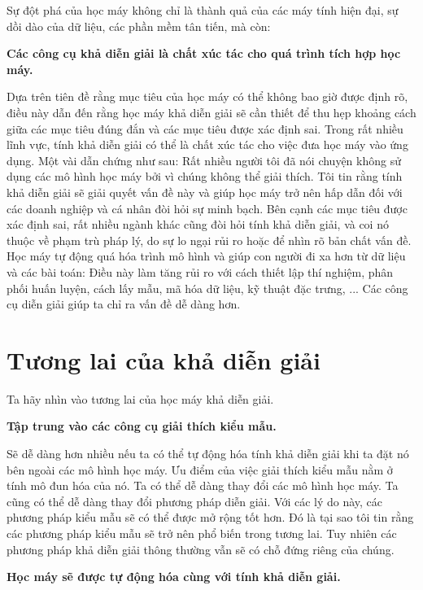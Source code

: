 Sự đột phá của học máy không chỉ là thành quả của các máy tính hiện đại, sự dồi dào của dữ liệu, các phần mềm tân tiến, mà còn:

\textbf{Các công cụ khả diễn giải là chất xúc tác cho quá trình tích hợp học máy.}

Dựa trên tiên đề rằng mục tiêu của học máy có thể không bao giờ được định rõ, điều này dẫn đến rằng học máy khả diễn giải sẽ cần thiết để thu hẹp khoảng cách giữa các mục tiêu đúng đắn và các mục tiêu được xác định sai. Trong rất nhiều lĩnh vực, tính khả diễn giải có thể là chất xúc tác cho việc đưa học máy vào ứng dụng. Một vài dẫn chứng như sau: Rất nhiều người tôi đã nói chuyện không sử dụng các mô hình học máy bởi vì chúng không thể giải thích. Tôi tin rằng tính khả diễn giải sẽ giải quyết vấn đề này và giúp học máy trở nên hấp dẫn đối với các doanh nghiệp và cá nhân đòi hỏi sự minh bạch. Bên cạnh các mục tiêu được xác định sai, rất nhiều ngành khác cũng đòi hỏi tính khả diễn giải, và coi nó thuộc về phạm trù pháp lý, do sự lo ngại rủi ro hoặc để nhìn rõ bản chất vấn đề. Học máy tự động quá hóa trình mô hình và giúp con người đi xa hơn từ dữ liệu và các bài toán: Điều này làm tăng rủi ro với cách thiết lập thí nghiệm, phân phối huấn luyện, cách lấy mẫu, mã hóa dữ liệu, kỹ thuật đặc trưng, ... Các công cụ diễn giải giúp ta chỉ ra vấn đề dễ dàng hơn.

\section{Tương lai của khả diễn giải}

Ta hãy nhìn vào tương lai của học máy khả diễn giải.

\textbf{Tập trung vào các công cụ giải thích kiểu mẫu.}

Sẽ dễ dàng hơn nhiều nếu ta có thể tự động hóa tính khả diễn giải khi ta đặt nó bên ngoài các mô hình học máy. Ưu điểm của việc giải thích kiểu mẫu nằm ở tính mô đun hóa của nó. Ta có thể dễ dàng thay đổi các mô hình học máy. Ta cũng có thể dễ dàng thay đổi phương pháp diễn giải. Với các lý do này, các phương pháp kiểu mẫu sẽ có thể được mở rộng tốt hơn. Đó là tại sao tôi tin rằng các phương pháp kiểu mẫu sẽ trở nên phổ biến trong tương lai. Tuy nhiên các phương pháp khả diễn giải thông thường vẫn sẽ có chỗ đứng riêng của chúng.

\textbf{Học máy sẽ được tự động hóa cùng với tính khả diễn giải.}

